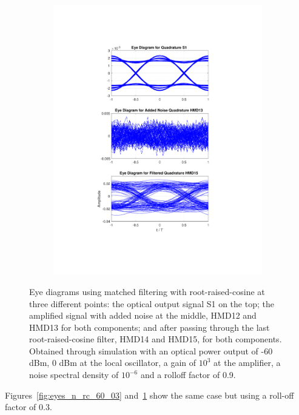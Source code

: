 \begin{figure}[H]
\begin{subfigure}{.45\textwidth}
		\includegraphics[clip, trim=5cm 4cm 5cm 4cm, width=\textwidth]{./sdf/m_qam_system/figures/eyes/q_p_60_09.pdf}
	\end{subfigure}
	
	\caption{Eye diagrams using matched filtering with root-raised-cosine at three different points: the optical output signal S1 on the top; the amplified signal with added noise at the middle, HMD12 and HMD13 for both components; and after passing through the last root-raised-cosine filter, HMD14 and HMD15, for both components. Obtained through simulation with an optical power output of -60 dBm, 0 dBm at the local oscillator, a gain of $10^3$ at the amplifier, a noise spectral density of $10^{-6}$ and a rolloff factor of 0.9.\label{fig:eyes_n_rrc_60_09}}
	
\end{figure}


Figures~\ref{fig:eyes_n_rc_60_03} and~\ref{fig:eyes_n_rrc_60_09} show the same
case but using a roll-off factor of 0.3.

